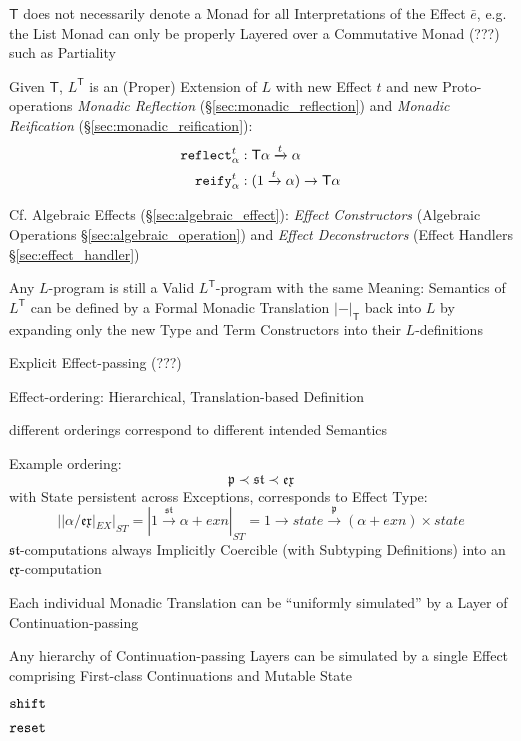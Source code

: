 \fist $\mathsf{T}$ does not necessarily denote a Monad for all
Interpretations of the Effect $\bar{e}$, e.g. the List Monad can only
be properly Layered over a Commutative Monad (???) such as Partiality

Given $\mathsf{T}$, $L^\mathsf{T}$ is an (Proper) Extension of $L$
with new Effect $t$ and new Proto-operations \emph{Monadic Reflection}
(\S\ref{sec:monadic_reflection}) and \emph{Monadic Reification}
(\S\ref{sec:monadic_reification}):
\begin{align*}
  \mathtt{reflect}_\alpha^t &: \mathsf{T} \alpha \xrightarrow{t} \alpha \\
  \mathtt{reify}_\alpha^t &: (1 \xrightarrow{t} \alpha) \rightarrow
    \mathsf{T} \alpha
\end{align*}

\fist Cf. Algebraic Effects (\S\ref{sec:algebraic_effect}):
\emph{Effect Constructors} (Algebraic Operations
\S\ref{sec:algebraic_operation}) and \emph{Effect Deconstructors}
(Effect Handlers \S\ref{sec:effect_handler})

Any $L$-program is still a Valid $L^\mathsf{T}$-program with the same
Meaning: Semantics of $L^\mathsf{T}$ can be defined by a Formal
Monadic Translation $|-|_\mathsf{T}$ back into $L$ by expanding only
the new Type and Term Constructors into their $L$-definitions

Explicit Effect-passing (???)

Effect-ordering: Hierarchical, Translation-based Definition

different orderings correspond to different intended Semantics

Example ordering:
\[
\mathfrak{p} \prec \mathfrak{st} \prec \mathfrak{ex}
\]
with State persistent across Exceptions, corresponds to Effect Type:
\[
  ||\alpha / \mathfrak{ex}|_{EX}|_{ST} = |1
  \xrightarrow{\mathfrak{st}} \alpha + exn|_{ST} = 1 \rightarrow state
  \xrightarrow{\mathfrak{p}} (\alpha + exn) \times state
\]
$\mathfrak{st}$-computations always Implicitly Coercible (with
Subtyping Definitions) into an
$\mathfrak{ex}$-computation

Each individual Monadic Translation can be ``uniformly simulated'' by
a Layer of Continuation-passing

Any hierarchy of Continuation-passing Layers can be simulated by a
single Effect comprising First-class Continuations and Mutable State

$\mathtt{shift}$

$\mathtt{reset}$

